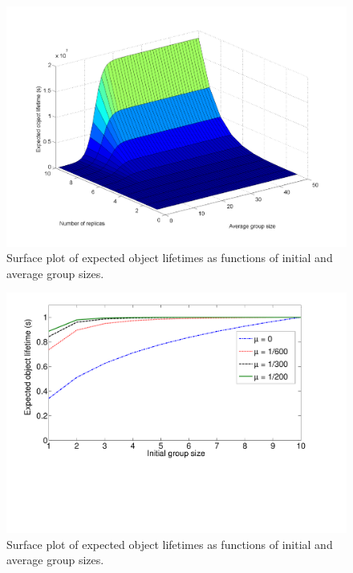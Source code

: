 \documentclass[10pt,a4paper,conference]{IEEEtran}
\begin{document}
\begin{figure}[htbp]
 \centering
 \includegraphics[clip=true, viewport=2.5cm 1.0cm 27.5cm 19.15cm, width=\columnwidth]{lifetime_replicas_av_groupsize}
 \caption{Surface plot of expected object lifetimes as functions of initial and average group sizes.}
 \label{fig_markov_example}
\end{figure}

\begin{figure}[htbp]
 \centering
 \includegraphics[clip=true, viewport=1.5cm 6.5cm 26.5cm 20cm, width=\columnwidth]{lifetime_replication_repair}
 \caption{Surface plot of expected object lifetimes as functions of initial and average group sizes.}
 \label{fig_markov_example}
\end{figure}
\end{document}
